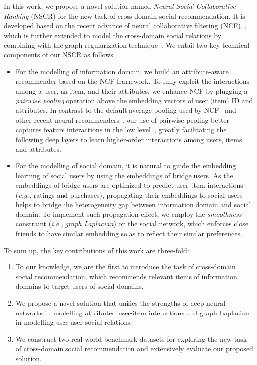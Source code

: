 \documentclass[sigconf]{acmart}
\newcommand{\ie}{\emph{i.e., }}
\newcommand{\eg}{\emph{e.g., }}
\begin{document}
\noindent In this work, we propose a novel solution named \emph{Neural Social Collaborative Ranking} (NSCR) for the new task of cross-domain social recommendation. It is developed based on the recent advance of neural collaborative filtering (NCF)~\cite{heneural}, which is further extended to model the cross-domain social relations by combining with the graph regularization technique~\cite{DBLP:conf/cikm/HeCKC15}. We entail two key technical components of our NSCR as follows. \begin{itemize}[leftmargin=*]
\item For the modelling of information domain, we build an attribute-aware recommender based on the NCF framework. To fully exploit the interactions among a user, an item, and their attributes, we enhance NCF by plugging a \textit{pairwise pooling} operation above the embedding vectors of user (item) ID and attributes. In contrast to the default average pooling used by NCF~\cite{heneural} and other recent neural recommenders~\cite{DBLP:conf/recsys/CovingtonAS16}, our use of pairwise pooling better captures feature interactions in the low level~\cite{he2017neural,DBLP:conf/uai/RendleFGS09}, greatly facilitating the following deep layers to learn higher-order interactions among users, items and attributes.
\item For the modelling of social domain, it is natural to guide the embedding learning of social users by using the embeddings of bridge users. As the embeddings of bridge users are optimized to predict user--item interactions (\eg ratings and purchases), propagating their embeddings to social users helps to bridge the heterogeneity gap between information domain and social domain. To implement such propagation effect, we employ the \emph{smoothness} constraint (\ie\emph{graph Laplacian}) on the social network, which enforces close friends to have similar embedding so as to reflect their similar preferences.
\end{itemize}



\noindent To sum up, the key contributions of this work are three-fold:
\begin{enumerate}[leftmargin=*]
  \item To our knowledge, we are the first to introduce the task of cross-domain social recommendation, which recommends relevant items of information domains to target users of social domains.
  \item We propose a novel solution that unifies the strengths of deep neural networks in modelling attributed user-item interactions and graph Laplacian in modelling user-user social relations.
\item We construct two real-world benchmark datasets for exploring the new task of cross-domain social recommendation and extensively evaluate our proposed solution.
\end{enumerate}
\end{document}
